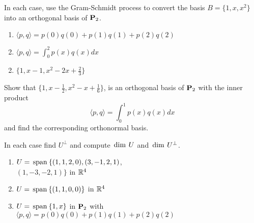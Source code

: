 \begin{multicols}{2}
\begin{ex}
\begin{sol}
\begin{enumerate}[label={\alph*.}]
\end{enumerate}
\end{sol}
\end{ex}

\begin{ex}
In each case, use the Gram-Schmidt process to convert the basis $B = \{1, x, x^{2}\}$ into an orthogonal basis of $\textbf{P}_{2}$.

\begin{enumerate}[label={\alph*.}]
\item $ \langle p, q \rangle = p(0)q(0) + p(1)q(1) + p(2)q(2) $

\item $ \langle p, q \rangle = \int_{0}^{2} p(x)q(x)dx $

\end{enumerate}
\begin{sol}
\begin{enumerate}[label={\alph*.}]
\setcounter{enumi}{1}
\item  $\{1, x - 1, x^{2} - 2x + \frac{2}{3}\}$

\end{enumerate}
\end{sol}
\end{ex}

\begin{ex}
Show that $\{1, x - \frac{1}{2}, x^2 - x + \frac{1}{6} \}$, is an orthogonal basis of $\textbf{P}_{2}$ with the inner product 
\begin{equation*}
\langle p, q \rangle = \int_{0}^{1} p(x)q(x)dx
\end{equation*}
and find the corresponding orthonormal basis.
\end{ex}

\begin{ex}
In each case find $U^{\perp}$ and compute $\thinspace\operatorname{dim\medspace} U$ and $\thinspace\operatorname{dim\medspace} U^{\perp}$.

\begin{enumerate}[label={\alph*.}]
\item $ U = \thinspace\operatorname{span\medspace}\{(1, 1, 2, 0), (3, -1, 2, 1)$, \\ $(1, -3, -2, 1) \} $ in $\mathbb{R}^4$

\item $ U = \thinspace\operatorname{span\medspace}\{(1, 1, 0, 0) \} $ in $\mathbb{R}^4$

\item $ U = \thinspace\operatorname{span\medspace}\{1, x\} $ in $ \textbf{P}_2 $ with \\$ \langle p, q \rangle = p(0)q(0) + p(1)q(1) + p(2)q(2) $


\end{enumerate}
\end{ex}
\end{multicols}
